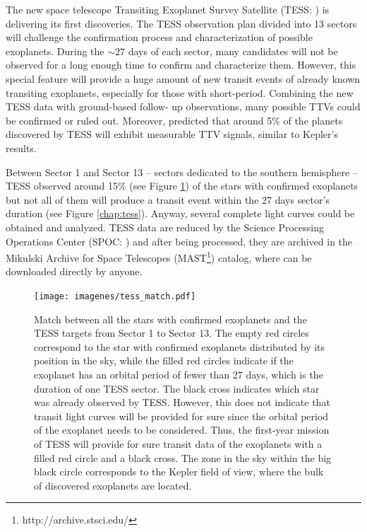 The new space telescope Transiting Exoplanet Survey Satellite (TESS: \cite{Ricker2014}) is delivering its first discoveries. The TESS observation plan divided into 13 sectors will challenge the confirmation process and characterization of possible exoplanets. During the $\sim27$ days of each sector, many candidates will not be observed for a long enough time to confirm and characterize them. However, this special feature will provide a huge amount of new transit events of already known transiting exoplanets, especially for those with short-period. Combining the new TESS data with ground-based follow- up observations, many possible TTVs could be confirmed or ruled out. Moreover, \cite{Ballard2018} predicted that around 5\% of the planets discovered by TESS will exhibit measurable TTV signals, similar to Kepler’s results.

Between Sector 1 and Sector 13 -- sectors dedicated to the southern hemisphere -- TESS observed around 15\% (see Figure \ref{match_tess}) of the stars with confirmed exoplanets but not all of them will produce a transit event within the 27 days sector's duration (see Figure \ref{chap:tess}). Anyway, several complete light curves could be obtained and analyzed. TESS data are reduced by the Science Processing Operations Center (SPOC: \cite{Jenkins2016}) and after being processed, they are archived in the Mikulski Archive for Space Telescopes (MAST\footnote{http://archive.stsci.edu/}) catalog, where can be downloaded directly by anyone. 

\begin{figure}
\centering
\texttt{[image: imagenes/tess\_match.pdf]}
\caption{Match between all the stars with confirmed exoplanets and the TESS targets from Sector 1 to Sector 13. The empty red circles correspond to the star with confirmed exoplanets distributed by its position in the sky, while the filled red circles indicate if the exoplanet has an orbital period of fewer than 27 days, which is the duration of one TESS sector. The black cross indicates which star was already observed by TESS. However, this does not indicate that transit light curves will be provided for sure since the orbital period of the exoplanet needs to be considered. Thus, the first-year mission of TESS will provide for sure transit data of the exoplanets with a filled red circle and a black cross. The zone in the sky within the big black circle corresponds to the Kepler field of view, where the bulk of discovered exoplanets are located.}
\label{match_tess}
\end{figure}

